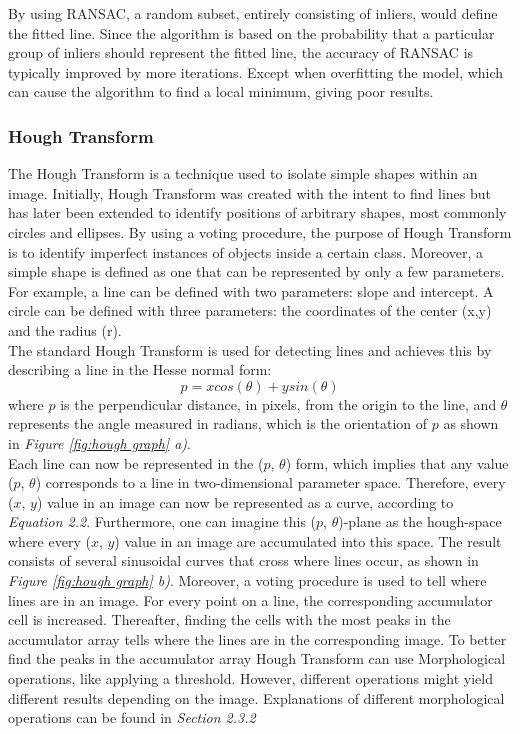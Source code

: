 \noindent By using RANSAC, a random subset, entirely consisting of inliers, would define the fitted line. Since the algorithm is based on the probability that a particular group of inliers should represent the fitted line, the accuracy of RANSAC is typically improved by more iterations. Except when overfitting the model, which can cause the algorithm to find a local minimum, giving poor results.


\subsubsection{Hough Transform}
The Hough Transform\cite{Duda} is a technique used to isolate simple shapes within an image. Initially, Hough Transform was created with the intent to find lines but has later been extended to identify positions of arbitrary shapes, most commonly circles and ellipses. By using a voting procedure, the purpose of Hough Transform is to identify imperfect instances of objects inside a certain class. Moreover, a simple shape is defined as one that can be represented by only a few parameters. For example, a line can be defined with two parameters: slope and intercept. A circle can be defined with three parameters: the coordinates of the center (x,y) and the radius (r).  \\

\noindent The standard Hough Transform is used for detecting lines and achieves this by describing a line in the Hesse normal form: \begin{equation} p = xcos(\theta) + ysin(\theta) \end{equation}  where $p$ is the perpendicular distance, in pixels, from the origin to the line, and $\theta$ represents the angle measured in radians, which is the orientation of $p$ as shown in \textit{Figure \ref{fig:hough graph} a)}. \\

\noindent Each line can now be represented in the ($p$, $\theta$) form, which implies that any value ($p$, $\theta$) corresponds to a line in two-dimensional parameter space. Therefore, every ($x$, $y$) value in an image can now be represented as a curve, according to \textit{Equation 2.2}. Furthermore, one can imagine this ($p$, $\theta$)-plane as the hough-space where every ($x$, $y$) value in an image are accumulated into this space. The result consists of several sinusoidal curves that cross where lines occur, as shown in \textit{Figure \ref{fig:hough graph}  b)}. Moreover, a voting procedure is used to tell where lines are in an image. For every point on a line, the corresponding accumulator cell is increased. Thereafter, finding the cells with the most peaks in the accumulator array tells where the lines are in the corresponding image. To better find the peaks in the accumulator array Hough Transform can use Morphological operations, like applying a threshold. However, different operations might yield different results depending on the image. Explanations of different morphological operations can be found in \textit{Section 2.3.2}

